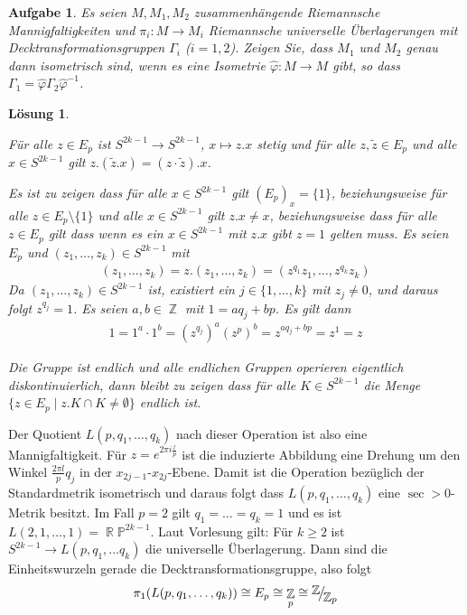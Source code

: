 \documentclass[paper=A4, twoside, chapterprefix=true, bibliography=totoc, headsepline]{scrbook}
\let\temp\phi{}
\let\phi\varphi{}
\let\varphi\temp{}
\let\temp\theta{}
\let\theta\vartheta{}
\let\vartheta\temp{}
\let\temp\epsilon{}
\let\epsilon\varepsilon{}
\let\varepsilon\temp{}
\let\temp\rho{}
\let\rho\varrho{}
\let\varrho\temp{}
\DeclareMathOperator{\R}{\mathbb{R}}
\DeclareMathOperator{\Z}{\mathbb{Z}}
\renewcommand{\P}{\ensuremath{\mathbb{P}}}
\newcommand{\FakRaum}[2]{
	\raisebox{0.7ex}{\ensuremath{#1}}
	\ensuremath{\mkern-3mu}\big/\ensuremath{\mkern-3mu}
	\raisebox{-0.6ex}{\ensuremath{#2}}}
\theoremstyle{plain}
\theoremstyle{nonumberplain}
\theoremstyle{empty}
\theoremstyle{break}
\newtheorem{Aufg}{Aufgabe}
\newtheorem{Loes}{L\"osung}
\begin{document}
\begin{Aufg}
Es seien $M, M_1,M_2$ zusammenhängende Riemannsche Mannigfaltigkeiten und $\pi_i:M \to M_i$ Riemannsche universelle Überlagerungen mit Decktransformationsgruppen $\Gamma_i$ ($i=1,2$). Zeigen Sie, dass $M_1$ und $M_2$ genau dann isometrisch sind, wenn es eine Isometrie $\hat{\phi}:M \to M$ gibt, so dass $\Gamma_1=\hat{\phi} \Gamma_2 \hat{\phi}^{-1}$.
\end{Aufg}

\begin{Loes}\begin{description}[leftmargin=*]
\item[Operation:]
	F\"ur alle $z \in E_p$ ist $S^{2k-1} \to S^{2k-1}$, $x \mapsto z.x$ stetig und f\"ur alle $z, \tilde z \in E_p$ und alle $x \in S^{2k-1}$ gilt $z.(\tilde z.x) = (z \cdot \tilde z).x$.
\item[Die Operation ist frei:]
	Es ist zu zeigen dass f\"ur alle $x \in S^{2k-1}$ gilt $(E_p)_x = \{1\}$, beziehungsweise f\"ur alle $z \in E_p \setminus \{1\}$ und alle $x \in S^{2k-1}$ gilt $z.x \ne x$, beziehungsweise dass f\"ur alle $z \in E_p$ gilt dass wenn es ein $x \in S^{2k-1}$ mit $z.x$ gibt $z=1$ gelten muss.
	Es seien $E_p$ und $(z_1,\ldots ,z_k) \in S^{2k-1}$ mit
	\begin{align*}
		(z_1,\ldots , z_k) = z.(z_1,\ldots ,z_k) = (z^{q_1} z_1, \ldots , z^{q_k} z_k)
	\end{align*}
	Da $(z_1, \ldots , z_k) \in S^{2k-1}$ ist, existiert ein $j \in \{1, \ldots ,k\}$ mit $z_j \ne 0$, und daraus folgt $z^{q_j} = 1$.
	Es seien $a,b \in \Z$ mit $1 = a q_j + b p$. Es gilt dann
	\begin{align*}
		1 = 1^a \cdot 1^b = (z^{q_j})^a (z^p)^b = z^{a q_j + b p} = z^1 = z
	\end{align*}
\item[Die Operation ist eigentlich kontinuierlich]
	Die Gruppe ist endlich und alle endlichen Gruppen operieren eigentlich diskontinuierlich, dann bleibt zu zeigen dass f\"ur alle $K \in S^{2k-1}$ die Menge $\{ z \in E_p \mid z.K \cap K \ne \emptyset \}$ endlich ist.
\end{description}\end{Loes}

Der Quotient $L(p, q_1, \ldots ,q_k)$ nach dieser Operation ist also eine Mannigfaltigkeit.
F\"ur $z = e^{2 \pi i \frac{l}{p}}$ ist die induzierte Abbildung eine Drehung um den Winkel $\frac{2 \pi l}{p} q_j$ in der $x_{2j-1}$-$x_{2j}$-Ebene.
Damit ist die Operation bez\"uglich der Standardmetrik isometrisch und daraus folgt dass $L(p, q_1, \ldots , q_k)$ eine $\sec > 0$-Metrik besitzt.
Im Fall $p = 2$ gilt $q_1 = \ldots = q_k = 1$ und es ist $L(2, 1, \ldots ,1) = \R\P^{2k-1}$.
Laut Vorlesung gilt: F\"ur $k \ge 2$ ist $S^{2k-1} \to L(p, q_1, \ldots  q_k)$ die universelle \"Uberlagerung.
Dann sind die Einheitswurzeln gerade die Decktransformationsgruppe, also folgt
\begin{align*}
	\pi_1(L(p, q_1, \ldots ,q_k)) \cong E_p \cong \Z_p \cong \FakRaum{\Z}{\Z_p}
\end{align*}
\end{document}
